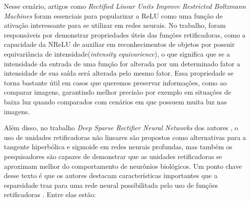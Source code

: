 Nesse cenário, artigos como \textit{Rectified Linear Units Improve Restricted Boltzmann Machines} foram essenciais para popularizar a ReLU como uma função de ativação interessante para se utilizar em redes neurais. No trabalho, \textcite{Nair2010} foram responsáveis por demonstrar propriedades úteis das funções retificadoras, como a capacidade da NReLU de auxiliar em reconhecimentos de objetos por possuir equivariância de intensidade(\textit{intensity equivarience}), o que significa que se a intensidade da entrada de uma função for alterada por um determinado fator a intensidade de sua saída será alterada pelo mesmo fator. Essa propriedade se torna bastante útil em casos que queremos preservar informações, como ao comparar imagens, garantindo melhor precisão por exemplo em situações de baixa luz quando comparados com cenários em que possuem muita luz nas imagens.

Além disso, no trabalho \textit{Deep Sparse Rectifier Neural Networks} dos autores \textcite{Glorot}, o uso de unidades retificadoras não lineares são propostos como alternativas para a tangente hiperbólica e sigmoide em redes neurais profundas, mas também os pesquisadores são capazes de demonstrar que as unidades retificadoras se aproximam melhor do comportamento de neurônios biológicos. Um ponto chave desse texto é que os autores destacam características importantes que a esparsidade traz para uma rede neural possibilitada pelo uso de funções retificadoras \parencite{Glorot}. Entre elas estão:

